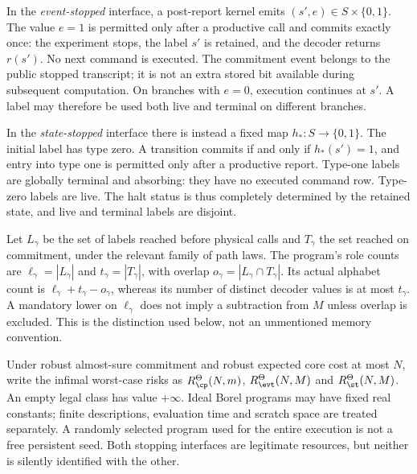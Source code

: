 \begin{definition}\label{def:stopping}
In the \emph{event-stopped} interface, a post-report kernel emits $(s',e)\in S\times\{0,1\}$. The value $e=1$ is permitted only after a productive call and commits exactly once: the experiment stops, the label $s'$ is retained, and the decoder returns $r(s')$. No next command is executed. The commitment event belongs to the public stopped transcript; it is not an extra stored bit available during subsequent computation. On branches with $e=0$, execution continues at $s'$. A label may therefore be used both live and terminal on different branches.

In the \emph{state-stopped} interface there is instead a fixed map $h_*:S\to\{0,1\}$. The initial label has type zero. A transition commits if and only if $h_*(s')=1$, and entry into type one is permitted only after a productive report. Type-one labels are globally terminal and absorbing: they have no executed command row. Type-zero labels are live. The halt status is thus completely determined by the retained state, and live and terminal labels are disjoint.
\end{definition}

Let $L_\gamma$ be the set of labels reached before physical calls and $T_\gamma$ the set reached on commitment, under the relevant family of path laws. The program's role counts are $\ell_\gamma=|L_\gamma|$ and $t_\gamma=|T_\gamma|$, with overlap $o_\gamma=|L_\gamma\cap T_\gamma|$. Its actual alphabet count is $\ell_\gamma+t_\gamma-o_\gamma$, whereas its number of distinct decoder values is at most $t_\gamma$. A mandatory lower on $\ell_\gamma$ does not imply a subtraction from $M$ unless overlap is excluded. This is the distinction used below, not an unmentioned memory convention.

Under robust almost-sure commitment and robust expected core cost at most $N$, write the infimal worst-case risks as $R_\cp^\Theta(N,m)$, $R_\evt^\Theta(N,M)$ and $R_\st^\Theta(N,M)$. An empty legal class has value $+\infty$. Ideal Borel programs may have fixed real constants; finite descriptions, evaluation time and scratch space are treated separately. A randomly selected program used for the entire execution is not a free persistent seed. Both stopping interfaces are legitimate resources, but neither is silently identified with the other.
